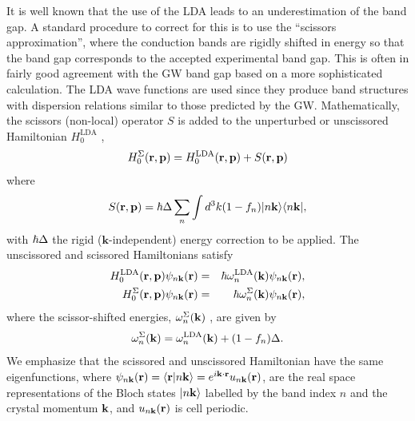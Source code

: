 \documentclass[floatfix,prb,aps,superscriptaddress,showpacs,11pt,preprint,letterpaper]{revtex4}
\begin{document}
It is well known that the use of the LDA
leads to an underestimation of the band gap. A standard
procedure to correct for this is to
use the ``scissors approximation'', where the 
conduction bands are rigidly shifted in energy so that the band gap 
corresponds to the accepted 
experimental band gap.\cite{levinePRL89,levinePRL91,delsolePRB93} 
This is often in fairly good agreement with the GW
band gap based on a more sophisticated calculation.\cite{hybertsenPRB86}
The LDA wave functions are used since they produce band
structures with dispersion relations similar to those predicted by the GW.
Mathematically, the scissors (non-local) operator 
$S$ is added to the unperturbed or unscissored Hamiltonian $H^{\mathrm{LDA}}_{0}$ ,
\begin{equation*}
H^\Sigma_{0}(\mathbf{r},\mathbf{p})=H^{\mathrm{LDA}}_{0}(\mathbf{r},\mathbf{p})+S(\mathbf{r},\mathbf{p})
\end{equation*}
where 
\begin{equation}
S(\mathbf{r},\mathbf{p})=\hbar \Delta\sum_{n}\int d^{3}k(1-f_{n})
|n\mathbf{k}\rangle\langle n\mathbf{k}|,
\label{hats}
\end{equation}
with $\hbar \Delta$  the rigid ($\mathbf{k}$-independent) energy correction to be
applied. 
The unscissored and scissored Hamiltonians satisfy 
\begin{eqnarray*}
H^{\mathrm{LDA}}_{0}(\mathbf{r},\mathbf{p})\psi _{n\mathbf{k}}(\mathbf{r}) &=&\hbar \omega^{\mathrm{LDA}}_{n}(\mathbf{k})\psi _{n\mathbf{k}}(\mathbf{r}),
\label{hamils} \\
H_{0}^\Sigma (\mathbf{r},\mathbf{p})\psi _{n\mathbf{k}}(\mathbf{r}) &=&\hbar \omega_{n}^\Sigma
(\mathbf{k})\psi _{n\mathbf{k}}(\mathbf{r}),
\end{eqnarray*}
where the scissor-shifted energies, 
$\omega_{n}^\Sigma(\mathbf{k})$ , are given by
\begin{equation}
\omega_{n}^\Sigma(\mathbf{k})=\omega^{\mathrm{LDA}}_{n}(\mathbf{k})+(1-f_{n})\Delta.
\label{wese}
\end{equation}
We emphasize that the scissored and unscissored Hamiltonian 
have the same eigenfunctions, where
$\psi_{n\mathbf{k}}(\mathbf{r})=\langle {\mathbf{r}} | {n\mathbf{k}} \rangle=e^{i\mathbf{k}\cdot\mathbf{r}}u_{n\mathbf{k}}(\mathbf{r})$,
are the real space representations of the Bloch states $| n\mathbf{k} \rangle$ labelled 
by the band index $n$ and the crystal momentum $\mathbf{k}$, and $u_{n\mathbf{k}}(\mathbf{r})$
is cell periodic. 
\end{document}

